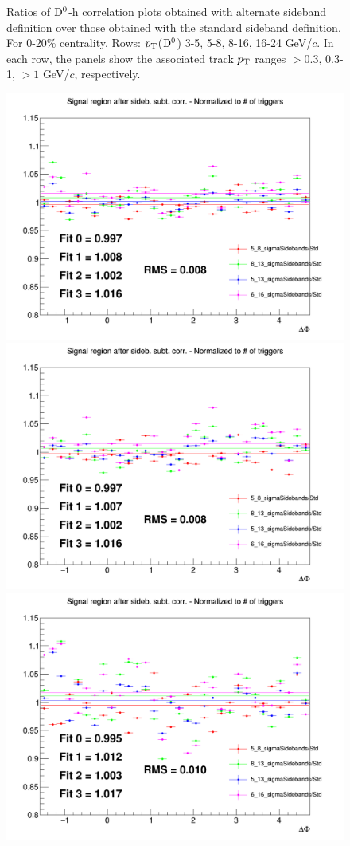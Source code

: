 \begin{figure}
 \caption{Ratios of ${\rm D^0}$-h correlation plots obtained with alternate sideband definition over those obtained with the standard sideband definition. For 0-20\% centrality. Rows: $p_{\rm T}$(${\rm D^0}$) 3-5, 5-8, 8-16, 16-24 GeV/$c$. In each row, the panels show the associated track
$p_{\rm T}$ ranges $> 0.3$, 0.3-1, $> 1$ GeV/$c$, respectively.}
\label{fig:SysBkg020}
\end{figure}


\begin{figure}
\centering
{\includegraphics[width=0.31\linewidth]{figuresVsCent/Dstar/SystSideb/0_20/Ratio_AzimCorrDistr_Dstar_Canvas_PtIntBins2to3_PoolInt_thr03to99_Sideband_020.png}}
{\includegraphics[width=0.31\linewidth]{figuresVsCent/Dstar/SystSideb/0_20/Ratio_AzimCorrDistr_Dstar_Canvas_PtIntBins2to3_PoolInt_thr03to1_Sideband_020.png}}
{\includegraphics[width=0.31\linewidth]{figuresVsCent/Dstar/SystSideb/0_20/Ratio_AzimCorrDistr_Dstar_Canvas_PtIntBins2to3_PoolInt_thr1to99_Sideband_020.png}} \\


\end{figure}
